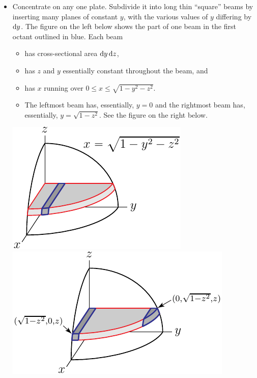 \begin{eg}
\begin{itemize}
\item 
Concentrate on any one plate. Subdivide it into long thin ``square'' beams
by inserting many planes of constant $y$, with the various values of $y$ differing by $\mathrm{d}y$. The figure on the left below shows the part 
of one beam in the first octant outlined in blue. Each beam
\vspace{-\topsep}
\begin{itemize} \itemsep1pt \parskip0pt 
\item 
has cross-sectional area  $\mathrm{d}y\,\mathrm{d}z$, 
\item
has $z$  and $y$ essentially constant throughout the beam, and 
\item
has $x$ running over $0\le x\le \sqrt{1-y^2-z^2}$.
\item The leftmost beam has, essentially, $y=0$ and the rightmost beam has,
essentially, $y=\sqrt{1-z^2}$.  See the figure on the right below.
\end{itemize}
\vspace{-\topsep}
\begin{efig}
\begin{center}
    \includegraphics{sphereMass2.pdf}\quad
    \includegraphics{sphereMass2a.pdf}
\end{center}
\end{efig}


\end{itemize}
\end{eg}
